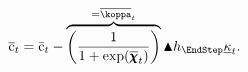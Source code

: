   \begin{equation}\begin{gathered}\begin{aligned}
        \Hi{\cFunc}_{\prd}  & = \bar{\cFunc}_{\prd}-\overbrace{\left(\frac{1}{1+\exp(\Hi{\chiFunc}_{\prd})}\right)}^{=\Hi{\koppa}_{\prd}} \aboveMin \hNrm_{\EndStep} \MPCmin_{\prd}. \label{eq:cFuncHi}
      \end{aligned}\end{gathered}\end{equation}

